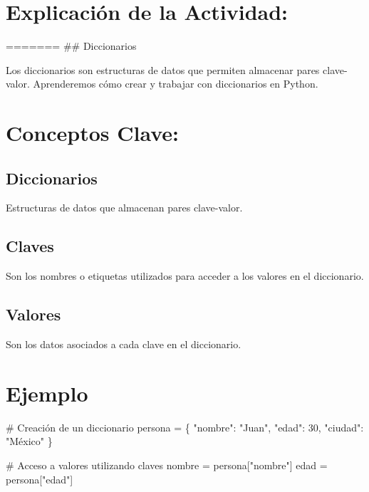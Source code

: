 \documentclass[
  a4paper,
  DIV=11,
  numbers=noendperiod,
  onepage,
  openany]{scrreprt}
\newenvironment{Shaded}{\begin{snugshade}}{\end{snugshade}}
\newcommand{\CommentTok}[1]{\textcolor[rgb]{0.37,0.37,0.37}{#1}}
\newcommand{\DecValTok}[1]{\textcolor[rgb]{0.68,0.00,0.00}{#1}}
\newcommand{\NormalTok}[1]{\textcolor[rgb]{0.00,0.23,0.31}{#1}}
\newcommand{\OperatorTok}[1]{\textcolor[rgb]{0.37,0.37,0.37}{#1}}
\newcommand{\StringTok}[1]{\textcolor[rgb]{0.13,0.47,0.30}{#1}}
\begin{document}
\hypertarget{explicaciuxf3n-de-la-actividad-22}{%
\section{Explicación de la
Actividad:}\label{explicaciuxf3n-de-la-actividad-22}}

======= \#\# Diccionarios

Los diccionarios son estructuras de datos que permiten almacenar pares
clave-valor. Aprenderemos cómo crear y trabajar con diccionarios en
Python.

\hypertarget{conceptos-clave-25}{%
\section{Conceptos Clave:}\label{conceptos-clave-25}}

\hypertarget{diccionarios-2}{%
\subsection{Diccionarios}\label{diccionarios-2}}

Estructuras de datos que almacenan pares clave-valor.

\hypertarget{claves-1}{%
\subsection{Claves}\label{claves-1}}

Son los nombres o etiquetas utilizados para acceder a los valores en el
diccionario.

\hypertarget{valores-1}{%
\subsection{Valores}\label{valores-1}}

Son los datos asociados a cada clave en el diccionario.

\hypertarget{ejemplo-25}{%
\section{Ejemplo}\label{ejemplo-25}}

\begin{Shaded}
\begin{Highlighting}[]
\CommentTok{\# Creación de un diccionario}
\NormalTok{persona }\OperatorTok{=}\NormalTok{ \{}
    \StringTok{"nombre"}\NormalTok{: }\StringTok{"Juan"}\NormalTok{,}
    \StringTok{"edad"}\NormalTok{: }\DecValTok{30}\NormalTok{,}
    \StringTok{"ciudad"}\NormalTok{: }\StringTok{"México"}
\NormalTok{\}}

\CommentTok{\# Acceso a valores utilizando claves}
\NormalTok{nombre }\OperatorTok{=}\NormalTok{ persona[}\StringTok{"nombre"}\NormalTok{]}
\NormalTok{edad }\OperatorTok{=}\NormalTok{ persona[}\StringTok{"edad"}\NormalTok{]}
\end{Highlighting}
\end{Shaded}
\end{document}
